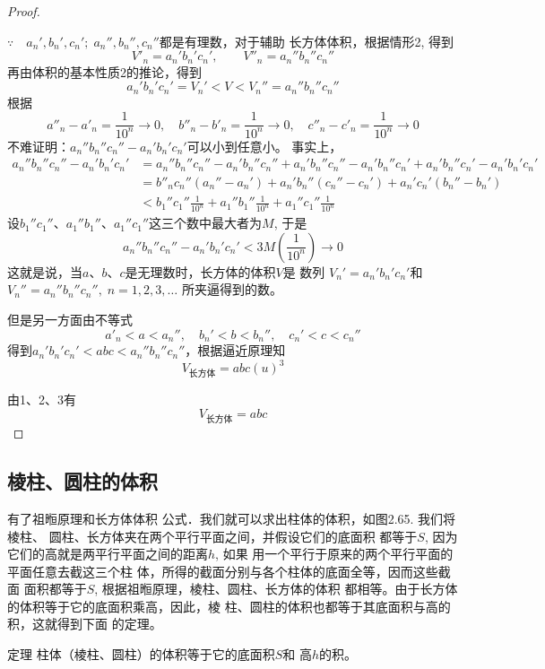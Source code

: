\begin{proof}
\begin{enumerate}
$\because\quad a_n', b_n', c_n';\; a_n'', b_n'', c_n''$都是有理数，对于辅助
长方体体积，根据情形2, 得到
\[V'_n=a_n'b_n'c_n', \qquad V''_n=a_n''b_n''c_n''\]
再由体积的基本性质2的推论，得到
\[a_n'b_n'c_n'=V_n'<V<V_n'' =a_n''b_n''c_n''\]
根据
\[a''_n-a'_n=\frac{1}{10^n}\to 0,\quad b''_n-b'_n=\frac{1}{10^n}\to 0,\quad c''_n-c'_n=\frac{1}{10^n}\to 0\]
不难证明：$a_n''b_n''c_n''-a_n'b_n'c_n'$可以小到任意小。
事实上，
\[\begin{split}
 a_n''b_n''c_n'' -a_n' b_n' c_n' 
&=a_n''b_n''c_n'' -a_n'b_n''c_n'' +a_n'b_n''c_n'' -a_n'b_n''c_n' +a_n'b_n''c_n' -a_n'b_n'c_n'\\ 
&=b''_n c_n'' (a_n''-a_n' )+a_n'b_n''(c_n''-c_n' )+a_n' c_n'(b_n''-b_n')\\
&<b_1''c_1''\frac{1}{10^n}+a_1''b_1''\frac{1}{10^n}+a_1''c_1''\frac{1}{10^n}
\end{split}\]
设$b_1''c_1''$、$a_1''b_1''$、$a_1''c_1''$这三个数中最大者为$M$, 于是
\[a_n''b_n''c_n''-a_n'b_n'c_n'<3M\left(\frac{1}{10^n}\right)\to 0\]
这就是说，当$a$、$b$、$c$是无理数时，长方体的体积$V$是
数列
$V_n' =a_n'b_n'c_n'$和$V_n''=a_n''b_n''c_n'',\; n=1,2,3,\ldots$
所夹逼得到的数。

但是另一方面由不等式
\[a'_n<a<a_n'',\quad b_n'<b<b_n'', \quad c_n'<c<c_n''\]
得到$a_n'b_n'c_n' <abc<a_n''b_n''c_n''$，根据逼近原理知
\[V_{\text{长方体}}=abc(u)^3\]
\end{enumerate}

由1、2、3有
\[V_{\text{长方体}}=abc\]
\end{proof}

\subsection{棱柱、圆柱的体积}

有了祖暅原理和长方体体积
公式．我们就可以求出柱体的体积，如图2.65. 我们将棱柱、
圆柱、长方体夹在两个平行平面之间，并假设它们的底面积
都等于$S$, 因为它们的高就是两平行平面之间的距离$h$, 如果
用一个平行于原来的两个平行平面的平面任意去截这三个柱
体，所得的截面分别与各个柱体的底面全等，因而这些截面
面积都等于$S$, 根据祖暅原理，棱柱、圆柱、长方体的体积
都相等。由于长方体的体积等于它的底面积乘高，因此，棱
柱、圆柱的体积也都等于其底面积与高的积，这就得到下面
的定理。

\begin{blk}
   {定理} 柱体（棱柱、圆柱）的体积等于它的底面积$S$和
高$h$的积。 
\end{blk}

